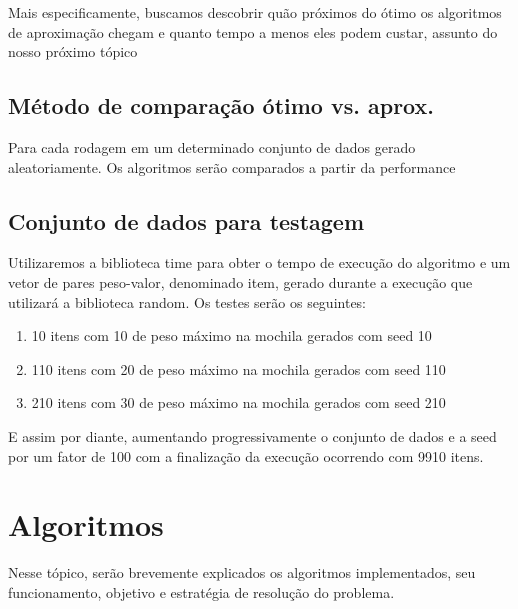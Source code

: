 \documentclass{article}
\begin{document}
            Mais especificamente, buscamos descobrir quão próximos do ótimo os algoritmos de aproximação chegam e quanto tempo a menos eles podem custar, assunto do nosso próximo tópico
    
    \subsection{Método de comparação ótimo vs. aprox.}
        Para cada rodagem em um determinado conjunto de dados gerado aleatoriamente. Os algoritmos
        serão comparados a partir da performance 
    \subsection{Conjunto de dados para testagem}
    Utilizaremos a biblioteca time para obter o tempo de execução do algoritmo e um vetor de pares peso-valor, denominado item, gerado durante a execução que utilizará a biblioteca random. Os testes serão os seguintes:
        \begin{enumerate}
            \item 10 itens com 10 de peso máximo na mochila gerados com seed 10
            \item 110 itens com 20 de peso máximo na mochila gerados com seed 110
            \item 210 itens com 30 de peso máximo na mochila gerados com seed 210
        \end{enumerate}
    E assim por diante, aumentando progressivamente o conjunto de dados e a seed por um fator de 100 com a finalização da execução ocorrendo com 9910 itens.
    
    \section{Algoritmos}\label{algoritmos}
    Nesse tópico, serão brevemente explicados os algoritmos implementados, seu funcionamento, objetivo e estratégia de resolução do problema.
    
\end{document}
